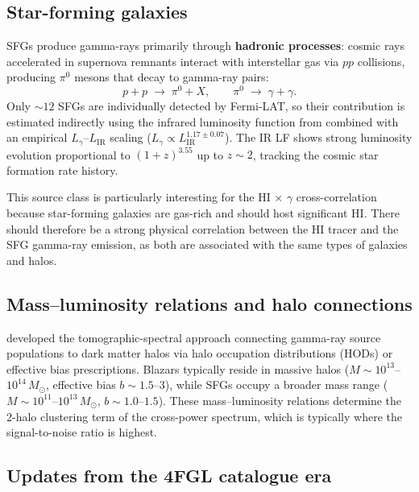 \documentclass[10pt,a4paper]{article}
\newcommand{\Msun}{M_\odot}
\begin{document}
\subsection{Star-forming galaxies}
\label{sec:sfg}

SFGs produce gamma-rays primarily through \textbf{hadronic processes}: cosmic rays accelerated in supernova remnants interact with interstellar gas via $pp$ collisions, producing $\pi^0$ mesons that decay to gamma-ray pairs:
\begin{equation}
    p + p \;\longrightarrow\; \pi^0 + X, \qquad \pi^0 \;\longrightarrow\; \gamma + \gamma.
\end{equation}
Only $\sim12$ SFGs are individually detected by Fermi-LAT, so their contribution is estimated indirectly using the infrared luminosity function from \citet{Gruppioni2013} combined with an empirical $L_\gamma$--$L_{\mathrm{IR}}$ scaling ($L_\gamma \propto L_{\mathrm{IR}}^{1.17\pm0.07}$). The IR LF shows strong luminosity evolution proportional to $(1+z)^{3.55}$ up to $z \sim 2$, tracking the cosmic star formation rate history.

This source class is particularly interesting for the HI$\,\times\,\gamma$ cross-correlation because star-forming galaxies are gas-rich and should host significant HI. There should therefore be a strong physical correlation between the HI tracer and the SFG gamma-ray emission, as both are associated with the same types of galaxies and halos.

\subsection{Mass--luminosity relations and halo connections}

\citet{Camera2015} developed the tomographic-spectral approach connecting gamma-ray source populations to dark matter halos via halo occupation distributions (HODs) or effective bias prescriptions. Blazars typically reside in massive halos ($M \sim 10^{13}$--$10^{14}\,\Msun$, effective bias $b \sim 1.5$--$3$), while SFGs occupy a broader mass range ($M \sim 10^{11}$--$10^{13}\,\Msun$, $b \sim 1.0$--$1.5$). These mass--luminosity relations determine the 2-halo clustering term of the cross-power spectrum, which is typically where the signal-to-noise ratio is highest.

\subsection{Updates from the 4FGL catalogue era}
\end{document}
